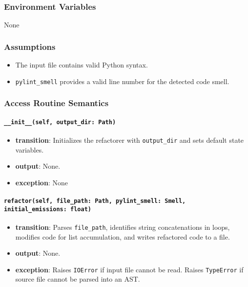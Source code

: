 \documentclass[12pt, titlepage]{article}
\begin{document}
\subsubsection{Environment Variables}
None
  
\subsubsection{Assumptions}
\begin{itemize}
  \item The input file contains valid Python syntax.
  \item \texttt{pylint\_smell} provides a valid line number for the detected code smell.
\end{itemize}
  
\subsubsection{Access Routine Semantics}
  
\paragraph{\texttt{\_\_init\_\_(self, output\_dir: Path)}}
\begin{itemize}
  \item \textbf{transition}: Initializes the refactorer with \texttt{output\_dir} and sets default state variables.
  \item \textbf{output}: None.
  \item \textbf{exception}: None
\end{itemize}
  
\paragraph{\texttt{refactor(self, file\_path: Path, pylint\_smell: Smell, initial\_emissions: float)}}
\begin{itemize}
  \item \textbf{transition}: Parses \texttt{file\_path}, identifies string concatenations in loops, modifies code for list accumulation, and writes refactored code to a file.
  \item \textbf{output}: None.
  \item \textbf{exception}: Raises \texttt{IOError} if input file cannot be read. Raises \texttt{TypeError} if source file cannot be parsed into an AST.
\end{itemize}
\end{document}

